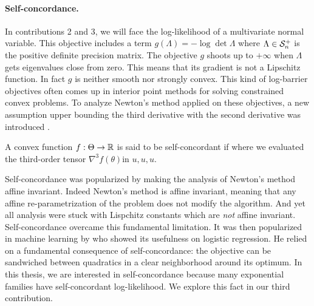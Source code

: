 \paragraph{Self-concordance.}
In contributions 2 and 3, we will face the log-likelihood of a multivariate normal variable.
This objective includes a term $g(\Lambda) = -\log \det \Lambda$ where $\Lambda\in {\mathcal S}_n^+$ is the positive definite precision matrix.
The objective $g$ shoots up to $+\infty$ when $\Lambda$ gets eigenvalues close from zero.
This means that its gradient is not a Lipschitz function.
In fact  $g$ is neither smooth nor strongly convex.
This kind of log-barrier objectives often comes up in interior point methods for solving constrained convex problems.
To analyze Newton's method applied on these objectives, a new assumption upper bounding the third derivative with the second derivative was introduced \citep{nemirovski1983problem}.
\begin{definition}
	\citep[definition 4.1.1]{nesterov2004Intro}
	A convex function $f:\Theta \rightarrow\mathbb{R}$ is said to be self-concordant if
	where we evaluated the third-order tensor $\nabla^3 f(\theta)$in $u,u,u$.
\end{definition}
Self-concordance was popularized by making the analysis of Newton's method affine invariant.
Indeed Newton's method is affine invariant, meaning that any affine re-parametrization of the problem does not modify the algorithm.
And yet all analysis were stuck with Lispchitz constants which are \emph{not} affine invariant.
Self-concordance overcame this fundamental limitation.
It was then popularized in machine learning by \citet{bach2010self} who showed its usefulness on logistic regression.
He relied on a fundamental consequence of self-concordance: the objective can be sandwiched between quadratics in a clear neighborhood around its optimum.
In this thesis, we are interested in self-concordance because many exponential families have self-concordant log-likelihood. 
We explore this fact in our third contribution.

